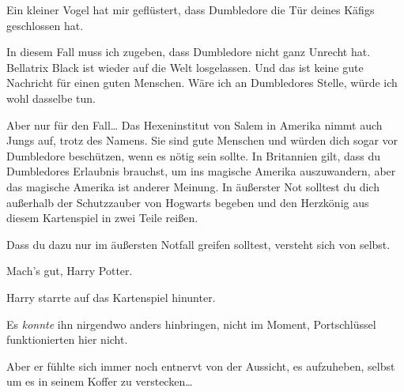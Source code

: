 \begin{writtenNote}
Ein kleiner Vogel hat mir geflüstert, dass Dumbledore die Tür deines Käfigs geschlossen hat.

In diesem Fall muss ich zugeben, dass Dumbledore nicht ganz Unrecht hat. Bellatrix Black ist wieder auf die Welt losgelassen. Und das ist keine gute Nachricht für einen guten Menschen. Wäre ich an Dumbledores Stelle, würde ich wohl dasselbe tun.

Aber nur für den Fall… Das Hexeninstitut von Salem in Amerika nimmt auch Jungs auf, trotz des Namens. Sie sind gute Menschen und würden dich sogar vor Dumbledore beschützen, wenn es nötig sein sollte. In Britannien gilt, dass du Dumbledores Erlaubnis brauchst, um ins magische Amerika auszuwandern, aber das magische Amerika ist anderer Meinung. In äußerster Not solltest du dich außerhalb der Schutzzauber von Hogwarts begeben und den Herzkönig aus diesem Kartenspiel in zwei Teile reißen.

Dass du dazu nur im äußersten Notfall greifen solltest, versteht sich von selbst.

Mach’s gut, Harry Potter.

\end{writtenNote}

Harry starrte auf das Kartenspiel hinunter.

Es \emph{konnte} ihn nirgendwo anders hinbringen, nicht im Moment, Portschlüssel funktionierten hier nicht.

Aber er fühlte sich immer noch entnervt von der Aussicht, es aufzuheben, selbst um es in seinem Koffer zu verstecken…

